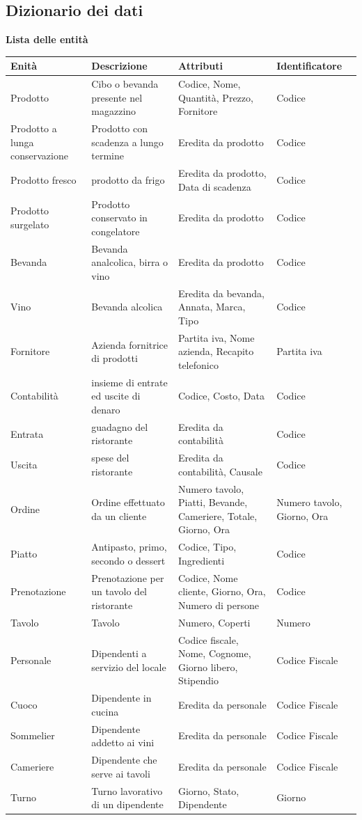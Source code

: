 \subsection{Dizionario dei dati}
\textbf{Lista delle entità}
\begin{longtable}{p{2.5cm} p{4cm} p{5cm} p{2.5cm}}
    \toprule
    \textbf{Enità} & \textbf{Descrizione} &   \textbf{Attributi} & \textbf{Identificatore}\\ \midrule
    Prodotto & Cibo o bevanda presente nel magazzino & Codice, Nome, Quantità, Prezzo, Fornitore&Codice\\ \midrule
    Prodotto a lunga conservazione  &Prodotto con scadenza a lungo termine &Eredita da prodotto &Codice\\ \midrule
    Prodotto fresco	&prodotto da frigo&Eredita da prodotto, Data di scadenza&Codice\\ \midrule
    Prodotto surgelato&Prodotto conservato in congelatore&Eredita da prodotto	&Codice\\ \midrule
    Bevanda	&Bevanda analcolica, birra o vino&Eredita da prodotto&Codice\\ \midrule
    Vino&Bevanda alcolica&Eredita da bevanda, Annata, Marca, Tipo&Codice\\ \midrule
    Fornitore &Azienda fornitrice di prodotti&Partita iva, Nome azienda, Recapito telefonico&Partita iva\\ \midrule
    Contabilità&insieme di entrate ed uscite di denaro&Codice, Costo, Data &Codice\\ \midrule
    Entrata&guadagno del ristorante	&Eredita da contabilità&Codice\\ \midrule
    Uscita&spese del ristorante&Eredita da contabilità, Causale	&Codice\\ \midrule
    Ordine&Ordine effettuato da un cliente	&Numero tavolo, Piatti, Bevande, Cameriere, Totale, Giorno, Ora&Numero tavolo, Giorno, Ora\\ \midrule
    Piatto&Antipasto, primo, secondo o dessert&Codice, Tipo, Ingredienti&Codice\\ \midrule
    Prenotazione&Prenotazione per un tavolo del ristorante&Codice, Nome cliente, Giorno, Ora, Numero di persone&Codice\\ \midrule
    Tavolo&Tavolo&Numero, Coperti&Numero\\ \midrule
    Personale &Dipendenti a servizio del locale	&Codice fiscale, Nome, Cognome, Giorno libero, Stipendio&Codice Fiscale\\ \midrule
    Cuoco&Dipendente in cucina&Eredita da personale&Codice Fiscale\\ \midrule
    Sommelier&Dipendente addetto ai vini &Eredita da personale&Codice Fiscale\\ \midrule
    Cameriere&Dipendente che serve ai tavoli&Eredita da personale&Codice Fiscale\\ \midrule
    Turno &Turno lavorativo di un dipendente&Giorno, Stato, Dipendente&Giorno\\ 
    \bottomrule	
\end{longtable}

